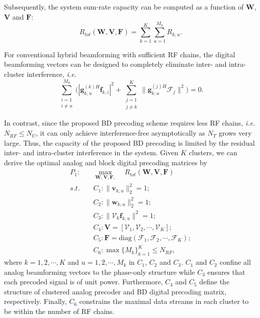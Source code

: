 \documentclass[conference]{IEEEtran}
\begin{document}
{Subsequently, the system sum-rate capacity can be computed as a function of $\bm{W}$, ${\bm V}$ and ${\bm F}$:
\begin{equation}
R_{tot}(\bm{W}, \bm{V}, \bm{F})=\sum_{k=1}^{K}\sum_{u=1}^{M_k}R_{k,u}.
\end{equation}

For conventional hybrid beamforming with sufficient RF chains, the digital beamforming vectors can be designed to completely eliminate inter- and intra-cluster interference, {\em i.e.}
\begin{equation}
 \displaystyle\sum_{\substack{i=1 \\ i\neq u}}^{M_k}\Big(|{\bm{g}}_{k,u}^{(k)H}\bm{f}_{k,i}|^2+\displaystyle\sum_{\substack{j=1\\j\neq k}}^{K}\|\bm{g}_{k,u}^{(j)H}\bm{\mathcal{F}}_j\|^2\Big)={0}.
\end{equation}

In contrast, since the proposed BD precoding scheme requires less RF chains, {\em i.e.} $N_{RF}\leq N_U$, it can only achieve interference-free asymptotically as $N_T$ grows very large. Thus, the capacity of the proposed BD precoding is limited by the residual inter- and intra-cluster interference in the system. Given $K$ clusters, we can derive the optimal analog and block digital precoding matrices by
\begin{align}\label{eq:maxsumrate}
P_1: \quad&\max_{\bm W, \bm{V},\bm F, }\quad R_{tot}(\bm{W}, \bm{V}, \bm{F})\\ \nonumber
s.t. \quad&C_1: \|\bm{v}_{k,u}\|^2_2=1; \\
&C_2: \|\bm{w}_{k,u}\|^2_2=1;\nonumber\\
&C_3: \|\bm{\mathcal{V}}_k \bm{f}_{k,u}\|^2=1;\nonumber\\
&C_4: \bm{V} = [\bm{\mathcal{V}}_1, \bm{\mathcal{V}}_2, \cdots, \bm{\mathcal{V}}_K];\nonumber\\
&C_5: \bm{F} = \text{diag}(\bm{\mathcal{F}}_1, \bm{\mathcal{F}}_2, \cdots, \bm{\mathcal{F}}_{K});\nonumber\\
&C_6: \max \{M_k\}_{k=1}^K \leq N_{RF},\nonumber
\end{align}
where $k=1,2,\cdots,K$ and $u = 1, 2, \cdots, M_k$ in $C_1$, $C_2$ and $C_3$. $C_1$ and $C_2$ confine all analog beamforming vectors to the phase-only structure while $C_3$ ensures that each precoded signal is of unit power. Furthermore, $C_4$ and $C_5$ define the structure of clustered analog precoder and BD digital precoding matrix, respectively. Finally,  $C_6$ constrains the maximal data streams in each cluster to be within the number of RF chains.

}
\end{document}
